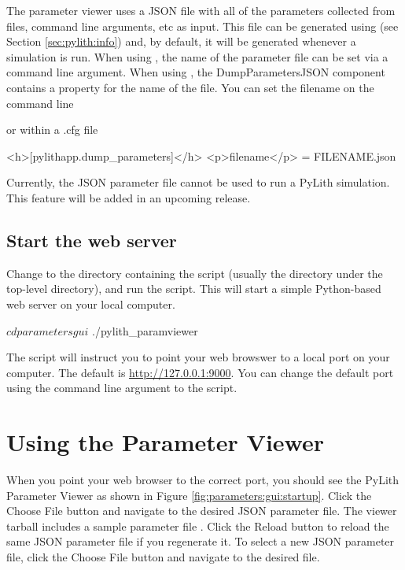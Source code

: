 The parameter viewer uses a JSON file with all of the parameters
collected from  files, command line arguments, etc as
input. This file can be generated using  (see
Section \ref{sec:pylith:info}) and, by default, it will be generated
whenever a  simulation is run. When using
, the name of the parameter file can be set via a
command line argument. When using , the
DumpParametersJSON component contains a property for the name of the
file. You can set the filename on the command line
or within a .cfg file
\begin{cfg}
<h>[pylithapp.dump_parameters]</h>
<p>filename</p> = FILENAME.json
\end{cfg}
Currently, the JSON parameter file cannot be used to run a PyLith
simulation. This feature will be added in an upcoming release.


\subsection{Start the web server}

Change to the directory containing the 
script (usually the  directory under the top-level
 directory), and run the 
script. This will start a simple Python-based web server on your local
computer.
\begin{shell}
$ cd parametersgui
$ ./pylith_paramviewer
\end{shell}
The script will instruct you to point your web browswer to a local
port on your computer. The default is \url{http://127.0.0.1:9000}.
You can change the default port using the  command
line argument to the  script.


\section{Using the Parameter Viewer}

When you point your web browser to the correct port, you should see
the PyLith Parameter Viewer as shown in Figure
\ref{fig:parameters:gui:startup}.  Click the \textsf{Choose File}
button and navigate to the desired JSON parameter file. The viewer
tarball includes a sample parameter file
. Click the \textsf{Reload} button
to reload the same JSON parameter file if you regenerate it. To select
a new JSON parameter file, click the \textsf{Choose File} button and
navigate to the desired file.

